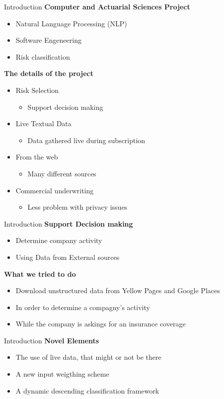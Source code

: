 

\begin{frame}[label=intro]{Introduction}
	\textbf{Computer and Actuarial Sciences Project}
	\begin{itemize}
		
		\item Natural Language Processing (NLP)
		\item Software Engeneering
		\item Risk classification
		
	\end{itemize}
	
	\textbf{The details of the project}
	\begin{itemize}
		\item Risk Selection
		\begin{itemize}
			\item Support decision making
		\end{itemize}			
		\item Live Textual Data
		\begin{itemize}
			\item Data gathered live during subscription
		\end{itemize}
		\item From the web
		\begin{itemize}
			\item Many different sources
		\end{itemize}
		\item Commercial underwriting
		\begin{itemize}
			\item Less problem with privacy issues
		\end{itemize}
	\end{itemize}
	
\end{frame}



\begin{frame}[label=intro]{Introduction}
	\textbf{Support Decision making}
	\begin{itemize}
		\item Determine company activity
		\item Using Data from External sources
	\end{itemize}
	\textbf{What we tried to do}
	\begin{itemize}
		\item Download unstructured data from Yellow Pages and Google Places
		\item In order to determine a compagny's activity
		\item While the company is askings for an insurance coverage
	\end{itemize}
\end{frame}


\begin{frame}[label=intro]{Introduction}
	\textbf{Novel Elements}
	\begin{itemize}
		\item The use of live data, that might or not be there
		\item A new input weigthing scheme 
		\item A dynamic descending classification framework
	\end{itemize}
\end{frame}

